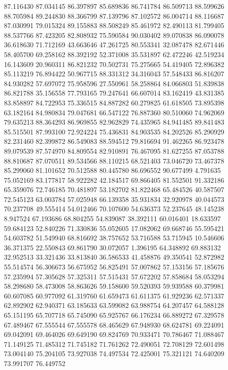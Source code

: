 87.116430
87.034145
86.397897
85.689836
86.741784
86.509713
88.599626
88.705984
89.244830
88.366799
87.139796
87.102572
86.004714
88.116687
87.030991
79.015324
89.155883
88.508249
85.461972
82.490113
81.799405
88.537766
87.423205
82.808932
75.590584
90.030402
89.070838
86.090078
36.618630
71.712169
43.663646
47.261725
80.553341
32.087478
82.671446
58.405700
69.258162
88.392192
52.371008
35.531897
62.472246
42.519234
16.143609
20.960311
86.821232
70.502731
75.275665
54.419405
72.896382
85.113219
76.894422
50.967715
88.331312
34.316043
57.548433
86.816207
84.930282
57.697072
75.958596
27.550961
58.258864
84.066803
51.839838
86.821788
35.156558
77.793165
79.247641
66.607014
83.162419
43.831385
83.858897
84.722953
75.336515
84.887282
60.279825
61.618505
73.895398
63.182164
84.980834
79.047681
66.547122
76.887360
80.510060
74.962069
79.635213
88.364293
86.969855
82.962829
74.435965
84.941485
89.841483
85.515501
87.993100
72.924224
75.436831
84.903535
84.202526
85.290929
82.231460
82.399872
86.549083
88.594512
79.816694
91.462265
86.923478
89.079539
87.574970
84.809554
82.910891
76.467095
81.627255
87.053788
88.810687
87.070511
89.534566
88.110215
68.521403
73.046720
73.467378
85.299060
81.101652
70.512588
80.445780
86.696552
90.677499
4.791635
75.052169
83.177817
58.922282
42.184517
69.866405
81.552501
91.332186
65.359076
72.746185
70.481897
53.182702
81.822468
65.484526
40.587507
72.545123
63.003784
57.025948
66.139358
35.931834
32.920978
40.044573
70.237708
49.555414
54.012466
70.107600
54.636373
52.237645
48.145238
8.947524
67.193686
68.804255
54.839087
38.392111
60.016401
18.633597
59.684123
52.840226
71.330836
55.052605
17.082062
69.668746
55.595421
54.603782
51.549940
68.816692
38.757652
53.716588
53.715945
10.546606
36.371375
22.550843
69.861790
30.072057
1.396195
64.348892
69.883132
32.952513
33.321436
33.813840
36.586533
41.458876
49.350541
52.872982
55.514574
56.306673
56.675952
56.825491
57.007862
57.153156
57.185676
57.235994
57.305628
57.325311
57.515431
57.672202
57.858684
58.053294
58.298680
58.473008
58.863626
59.158600
59.520393
59.939588
60.379981
60.607085
60.977092
61.319760
61.659473
61.611375
61.929236
62.571337
62.892902
62.940371
63.185633
63.599082
63.988754
64.207457
64.588128
65.151195
65.707718
65.745090
65.925767
66.176234
66.889272
67.329578
67.489467
67.555544
67.555578
68.465629
67.948930
68.624781
69.224091
69.042091
69.464026
69.649190
69.824769
70.933471
70.786467
71.088467
71.149125
71.485312
71.745182
71.761262
72.490051
72.708129
72.601498
73.004140
75.204105
73.927038
74.497534
72.425001
75.321121
74.640209
73.991707
76.449752
